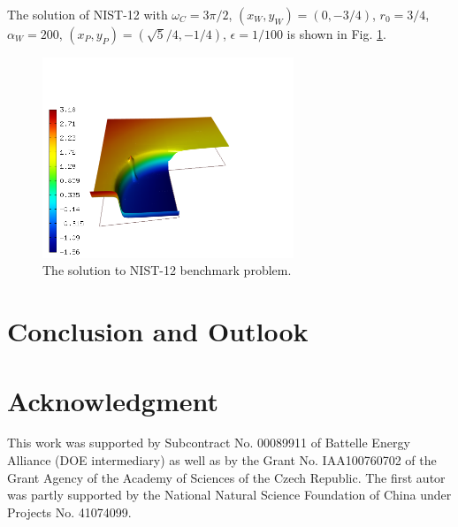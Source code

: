 \documentclass[12pt]{elsarticle}
\begin{document}
The solution of NIST-12 with $\omega_C = 3 \pi /2$,
$(x_{W}, y_{W}) = (0, -3/4)$, $r_{0} = 3/4$, $\alpha_{W} = 200$,
$(x_{P}, y_{P}) = (\sqrt{5} / 4, -1/4)$,
$\epsilon = 1/100$ is shown in Fig. \ref{fig:sln-nist12}.

\begin{figure}[!ht]
\centering
\includegraphics[height=6cm]{nist/nist-12/solution.png}
\caption{The solution to NIST-12 benchmark problem.}
\label{fig:sln-nist12}
\end{figure}

\section{Conclusion and Outlook}
\label{sec:conclusion}


\section{Acknowledgment}

This work was supported by Subcontract No. 00089911 of Battelle
Energy Alliance (DOE intermediary) as well as by the
Grant No. IAA100760702 of the Grant Agency of the Academy
of Sciences of the Czech Republic. The first autor was partly
supported by the National Natural Science Foundation
of China under Projects No. 41074099.
\end{document}
